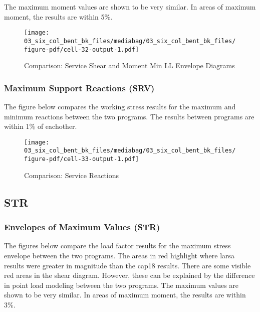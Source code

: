 \documentclass[
  letterpaper,
  DIV=11,
  numbers=noendperiod]{scrartcl}
\begin{document}
The maximum moment values are shown to be very similar. In areas of
maximum moment, the results are within 5\%.

\begin{figure}[H]

{\centering \texttt{[image: 03\_six\_col\_bent\_bk\_files/mediabag/03\_six\_col\_bent\_bk\_files/figure-pdf/cell-32-output-1.pdf]}

}

\caption{Comparison: Service Shear and Moment Min LL Envelope Diagrams}

\end{figure}%

\newpage{}

\subsubsection{Maximum Support Reactions
(SRV)}\label{maximum-support-reactions-srv-2}

The figure below compares the working stress results for the maximum and
minimum reactions between the two programs. The results between programs
are within 1\% of eachother.

\begin{figure}[H]

{\centering \texttt{[image: 03\_six\_col\_bent\_bk\_files/mediabag/03\_six\_col\_bent\_bk\_files/figure-pdf/cell-33-output-1.pdf]}

}

\caption{Comparison: Service Reactions}

\end{figure}%

\newpage{}

\subsection{STR}\label{str-2}

\subsubsection{Envelopes of Maximum Values
(STR)}\label{envelopes-of-maximum-values-str-2}

The figures below compare the load factor results for the maximum stress
envelope between the two programs. The areas in red highlight where
larsa results were greater in magnitude than the cap18 results. There
are some visible red areas in the shear diagram. However, these can be
explained by the difference in point load modeling between the two
programs. The maximum values are shown to be very similar. In areas of
maximum moment, the results are within 3\%.
\end{document}
